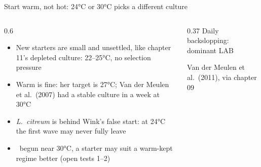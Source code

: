\documentclass[aspectratio=169,11pt]{beamer}
\begin{document}
\begin{frame}{Start warm, not hot: 24°C or 30°C picks a different culture}
  \begin{columns}[T]
    \begin{column}{0.6\textwidth}
      \small
      \begin{itemize}
        \item New starters are small and unsettled, like chapter 11's depleted culture: 22--25°C, no selection pressure
        \item Warm is fine: her target is 27°C; Van der Meulen et al.\ (2007) had a stable culture in a week at 30°C
        \item \textit{L.\ citreum} is behind Wink's false start: at 24°C the first wave may never fully leave
        \item \hypothesis\ begun near 30°C, a starter may suit a warm-kept regime better (open tests 1--2)
      \end{itemize}
    \end{column}
    \begin{column}{0.37\textwidth}
      \centering
      {\scriptsize\color{muted} Daily backslopping: dominant LAB}\par\smallskip
      \par\smallskip
      {\scriptsize Van der Meulen et al.\ (2011), via chapter 09}
    \end{column}
  \end{columns}
\end{frame}
\end{document}
